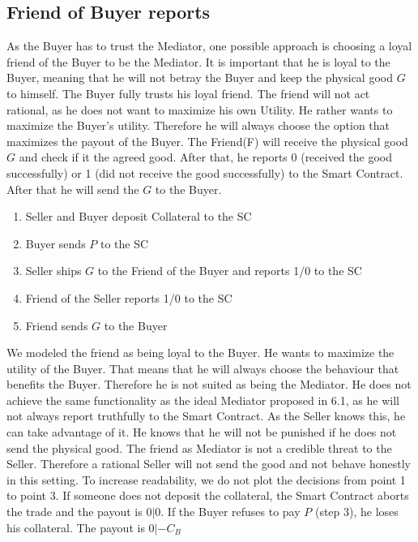 \documentclass{cacthesis}
\begin{document}
\subsection{Friend of Buyer reports}
As the Buyer has to trust the Mediator, one possible approach is choosing a loyal friend of the Buyer to be the Mediator. It is important that he is loyal to the Buyer, meaning that he will not betray the Buyer and keep the physical good $G$ to himself. The Buyer fully trusts his loyal friend. 
The friend will not act rational, as he does not want to maximize his own Utility. He rather wants to maximize the Buyer's utility. Therefore he will always choose the option that maximizes the payout of the Buyer.\newline
The Friend(F) will receive the physical good $G$ and check if it the agreed good. After that, he reports 0 (received the good successfully) or 1 (did not receive the good successfully) to the Smart Contract. After that he will send the $G$ to the Buyer.

\begin{enumerate}
    \item Seller and Buyer deposit Collateral to the SC
    \item Buyer sends $P$ to the SC
    \item Seller ships $G$ to the Friend of the Buyer and reports 1/0 to the SC
    \item Friend of the Seller reports 1/0 to the SC
    \item Friend sends $G$ to the Buyer
\end{enumerate}

We modeled the friend as being loyal to the Buyer. He wants to maximize the utility of the Buyer.\newline
That means that he will always choose the behaviour that benefits the Buyer. Therefore he is not suited as being the Mediator. He does not achieve the same functionality as the ideal Mediator proposed in 6.1, as he will not always report truthfully to the Smart Contract.\newline
As the Seller knows this, he can take advantage of it. He knows that he will not be punished if he does not send the physical good. The friend as Mediator is not a credible threat to the Seller. Therefore a rational Seller will not send the good and not behave honestly in this setting. 
To increase readability, we do not plot the decisions from point 1 to point 3. If someone does not deposit the collateral, the Smart Contract aborts the trade and the payout is $0|0$. If the Buyer refuses to pay $P$ (step 3), he loses his collateral. The payout is $0|-C_B$\newline
\end{document}
